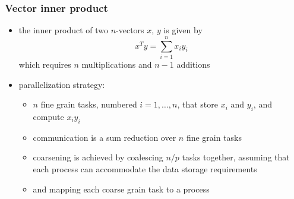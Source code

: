 \begin{frame}[fragile]
%
  \frametitle{Vector inner product}
%
  \begin{itemize}
%
  \item the inner product of two $n$-vectors $x$, $y$ is given by
    \begin{equation*}
    x^{T}y = \sum_{i=1}^{n} x_{i}y_{i}
    \end{equation*}
    which requires $n$ multiplications and $n-1$ additions
%
  \item parallelization strategy:
    \begin{itemize}
    \item $n$ fine grain tasks, numbered $i = 1, \ldots, n$, that store $x_{i}$ and $y_{i}$,
      and compute $x_{i} y_{i}$
    \item communication is a sum reduction over $n$ fine grain tasks
    \item coarsening is achieved by coalescing $n/p$ tasks together, assuming that each process
      can accommodate the data storage requirements
    \item and mapping each coarse grain task to a process
    \end{itemize}
%
  \end{itemize}
%
\end{frame}

